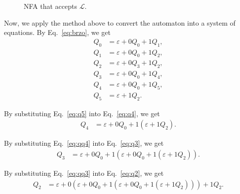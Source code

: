 \documentclass[12pt]{article}
\newcommand{\e}{\varepsilon}
\begin{document}
\begin{figure}[htbp]
  \centering
  \caption{NFA that accepts $\mathcal{L}$.}
\end{figure}

Now, we apply the method above to convert the automaton into a system of
equations. By Eq.~\ref{eq:brzo}, we get
\begin{align}
  \label{eq:q0} Q_0 &= \e + 0Q_0 + 1Q_1, \\
  \label{eq:q1} Q_1 &= \e + 0Q_0 + 1Q_2, \\
  \label{eq:q2} Q_2 &= \e + 0Q_3 + 1Q_2, \\
  \label{eq:q3} Q_3 &= \e + 0Q_0 + 1Q_4, \\
  \label{eq:q4} Q_4 &= \e + 0Q_0 + 1Q_5, \\
  \label{eq:q5} Q_5 &= \e + 1Q_2.
\end{align}

By substituting Eq.~\ref{eq:q5} into Eq.~\ref{eq:q4}, we get
\begin{align}\label{eq:qq4}
  Q_4 &= \e + 0Q_0 + 1(\e + 1Q_2).
\end{align}

By substituting Eq.~\ref{eq:qq4} into Eq.~\ref{eq:q3}, we get
\begin{align}\label{eq:qq3}
  Q_3 &= \e + 0Q_0 + 1(\e + 0Q_0 + 1(\e + 1Q_2)).
\end{align}

By substituting Eq.~\ref{eq:qq3} into Eq.~\ref{eq:q2}, we get
\begin{align}\label{eq:qq2}
  Q_2 &= \e + 0(\e + 0Q_0 + 1(\e + 0Q_0 + 1(\e + 1Q_2))) + 1Q_2.
\end{align}
\end{document}
